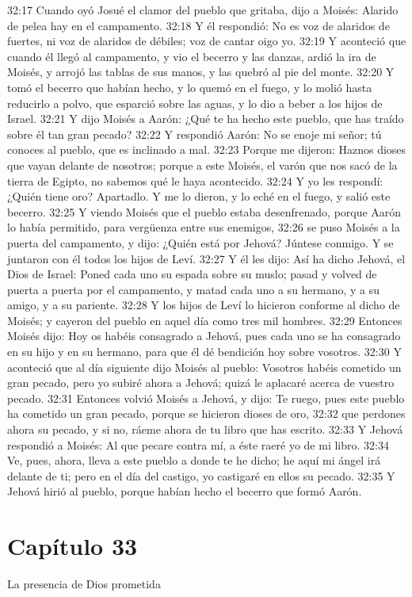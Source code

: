 32:17 Cuando oyó Josué el clamor del pueblo que gritaba, dijo a Moisés: Alarido de pelea hay en el campamento. 
32:18 Y él respondió: No es voz de alaridos de fuertes, ni voz de alaridos de débiles; voz de cantar oigo yo. 
32:19 Y aconteció que cuando él llegó al campamento, y vio el becerro y las danzas, ardió la ira de Moisés, y arrojó las tablas de sus manos, y las quebró al pie del monte. 
32:20 Y tomó el becerro que habían hecho, y lo quemó en el fuego, y lo molió hasta reducirlo a polvo, que esparció sobre las aguas, y lo dio a beber a los hijos de Israel. 
32:21 Y dijo Moisés a Aarón: ¿Qué te ha hecho este pueblo, que has traído sobre él tan gran pecado? 
32:22 Y respondió Aarón: No se enoje mi señor; tú conoces al pueblo, que es inclinado a mal. 
32:23 Porque me dijeron: Haznos dioses que vayan delante de nosotros; porque a este Moisés, el varón que nos sacó de la tierra de Egipto, no sabemos qué le haya acontecido. 
32:24 Y yo les respondí: ¿Quién tiene oro? Apartadlo. Y me lo dieron, y lo eché en el fuego, y salió este becerro. 
32:25 Y viendo Moisés que el pueblo estaba desenfrenado, porque Aarón lo había permitido, para vergüenza entre sus enemigos, 
32:26 se puso Moisés a la puerta del campamento, y dijo: ¿Quién está por Jehová? Júntese conmigo. Y se juntaron con él todos los hijos de Leví. 
32:27 Y él les dijo: Así ha dicho Jehová, el Dios de Israel: Poned cada uno su espada sobre su muslo; pasad y volved de puerta a puerta por el campamento, y matad cada uno a su hermano, y a su amigo, y a su pariente. 
32:28 Y los hijos de Leví lo hicieron conforme al dicho de Moisés; y cayeron del pueblo en aquel día como tres mil hombres. 
32:29 Entonces Moisés dijo: Hoy os habéis consagrado a Jehová, pues cada uno se ha consagrado en su hijo y en su hermano, para que él dé bendición hoy sobre vosotros. 
32:30 Y aconteció que al día siguiente dijo Moisés al pueblo: Vosotros habéis cometido un gran pecado, pero yo subiré ahora a Jehová; quizá le aplacaré acerca de vuestro pecado. 
32:31 Entonces volvió Moisés a Jehová, y dijo: Te ruego, pues este pueblo ha cometido un gran pecado, porque se hicieron dioses de oro, 
32:32 que perdones ahora su pecado, y si no, ráeme ahora de tu libro que has escrito. 
32:33 Y Jehová respondió a Moisés: Al que pecare contra mí, a éste raeré yo de mi libro. 
32:34 Ve, pues, ahora, lleva a este pueblo a donde te he dicho; he aquí mi ángel irá delante de ti; pero en el día del castigo, yo castigaré en ellos su pecado. 
32:35 Y Jehová hirió al pueblo, porque habían hecho el becerro que formó Aarón. 
\section*{Capítulo 33}
La presencia de Dios prometida 

